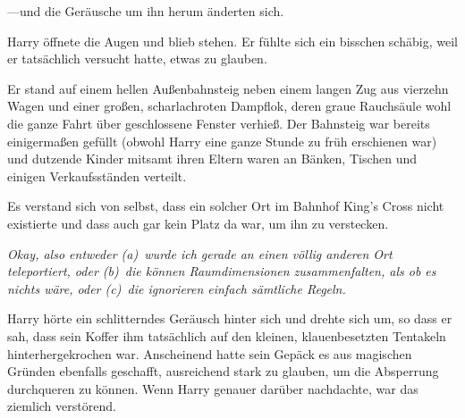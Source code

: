 —und die Geräusche um ihn herum änderten sich.

Harry öffnete die Augen und blieb stehen. Er fühlte sich ein bisschen schäbig, weil er tatsächlich versucht hatte, etwas zu glauben.

Er stand auf einem hellen Außenbahnsteig neben einem langen Zug aus vierzehn Wagen und einer großen, scharlachroten Dampflok, deren graue Rauchsäule wohl die ganze Fahrt über geschlossene Fenster verhieß. Der Bahnsteig war bereits einigermaßen gefüllt (obwohl Harry eine ganze Stunde zu früh erschienen war) und dutzende Kinder mitsamt ihren Eltern waren an Bänken, Tischen und einigen Verkaufsständen verteilt.

Es verstand sich von selbst, dass ein solcher Ort im Bahnhof King’s Cross nicht existierte und dass auch gar kein Platz da war, um ihn zu verstecken.

\emph{Okay, also entweder (a)~wurde ich gerade an einen völlig anderen Ort teleportiert, oder (b)~die können Raumdimensionen zusammenfalten, als ob es nichts wäre, oder (c)~die ignorieren einfach sämtliche Regeln.}

Harry hörte ein schlitterndes Geräusch hinter sich und drehte sich um, so dass er sah, dass sein Koffer ihm tatsächlich auf den kleinen, klauenbesetzten Tentakeln hinterhergekrochen war. Anscheinend hatte sein Gepäck es aus magischen Gründen ebenfalls geschafft, ausreichend stark zu glauben, um die Absperrung durchqueren zu können. Wenn Harry genauer darüber nachdachte, war das ziemlich verstörend.

